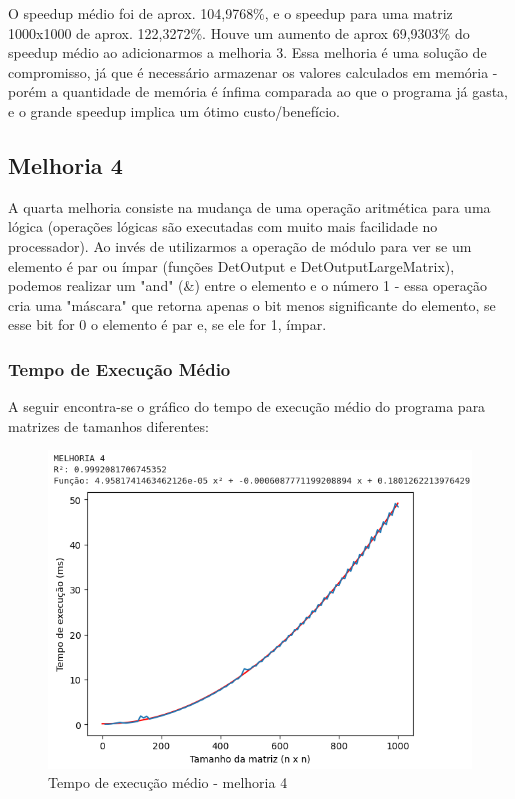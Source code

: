 O speedup médio foi de aprox. 104,9768\%, e o speedup para uma matriz 1000x1000 de aprox. 122,3272\%. Houve um aumento de aprox 69,9303\% do speedup médio ao adicionarmos a melhoria 3. Essa melhoria é uma solução de compromisso, já que é necessário armazenar os valores calculados em memória - porém a quantidade de memória é ínfima comparada ao que o programa já gasta, e o grande speedup implica um ótimo custo/benefício.

\newpage

\subsection{\esp Melhoria 4}
A quarta melhoria consiste na mudança de uma operação aritmética para uma lógica (operações lógicas são executadas com muito mais facilidade no processador). Ao invés de utilizarmos a operação de módulo para ver se um elemento é par ou ímpar (funções DetOutput e DetOutputLargeMatrix), podemos realizar um "and" (&) entre o elemento e o número 1 - essa operação cria uma "máscara" que retorna apenas o bit menos significante do elemento, se esse bit for 0 o elemento é par e, se ele for 1, ímpar. 

\subsubsection{\esp Tempo de Execução Médio}
A seguir encontra-se o gráfico do tempo de execução médio do programa para matrizes de tamanhos diferentes: 

\begin{figure}[!ht]
	\centering	
	\caption[\hspace{0.1cm}Tempo de execução médio - melhoria 4]{Tempo de execução médio - melhoria 4}
	  \vspace{-0.4cm}
	\includegraphics[width=.8\textwidth]{figuras/melhoria4.png}
\end{figure}

